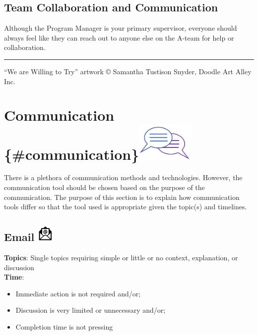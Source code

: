 \documentclass[
  letterpaper,
  DIV=11,
  numbers=noendperiod]{scrreprt}
\providecommand{\tightlist}{%
  \setlength{\itemsep}{0pt}\setlength{\parskip}{0pt}}\usepackage{longtable,booktabs,array}
\begin{document}
\section{Team Collaboration and
Communication}\label{team-collaboration-and-communication}

Although the Program Manager is your primary supervisor, everyone should
always feel like they can reach out to anyone else on the A-team for
help or collaboration.

\begin{center}\rule{0.5\linewidth}{0.5pt}\end{center}

``We are Willing to Try'' artwork © Samantha Tustison Snyder, Doodle Art
Alley Inc.


\chapter[Communication
\{\#communication\}]{\texorpdfstring{Communication
\{\#communication\}\protect\includegraphics[width=\textwidth,height=0.72917in]{_img/communication_icon.png}}{Communication \{\#communication\}}}\label{communication-communication}

There is a plethora of communication methods and technologies. However,
the communication tool should be chosen based on the purpose of the
communication. The purpose of this section is to explain how
communication tools differ so that the tool used is appropriate given
the topic(s) and timelines.

\section[Email ]{\texorpdfstring{Email
\protect\includegraphics[width=\textwidth,height=0.3125in]{_img/email_icon.png}}{Email }}\label{email}

\textbf{Topics}: Single topics requiring simple or little or no context,
explanation, or discussion\\
\textbf{Time}:

\begin{itemize}
\tightlist
\item
  Immediate action is not required and/or;\\
\item
  Discussion is very limited or unnecessary and/or;\\
\item
  Completion time is not pressing
\end{itemize}
\end{document}
